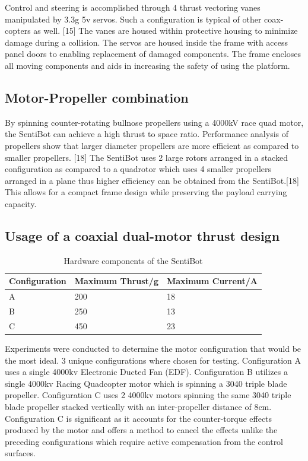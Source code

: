 \documentclass[12pt]{article}
\begin{document}
Control and steering is accomplished through 4 thrust vectoring vanes manipulated by 3.3g 5v servos. Such a configuration is typical of other coax-copters as well. [15] The vanes are housed within protective housing to minimize damage during a collision. The servos are housed inside the frame with access panel doors to enabling replacement of damaged components. The frame encloses all moving components and aids in increasing the safety of using the platform.

\subsection{Motor-Propeller combination}

By spinning counter-rotating bullnose propellers using a 4000kV race quad motor, the SentiBot can achieve a high thrust to space ratio. Performance analysis of propellers show that larger diameter propellers are more efficient as compared to smaller propellers. [18] The SentiBot uses 2 large rotors arranged in a stacked configuration as compared to a quadrotor which uses 4 smaller propellers arranged in a plane thus higher efficiency can be obtained from the SentiBot.[18] This allows for a compact frame design while preserving the payload carrying capacity.

\subsection{Usage of a coaxial dual-motor thrust design}

\begin{table}[b]
	\begin{tabular}{ | l | l l | }
		Configuration & Maximum Thrust/g & Maximum Current/A \\
		\hline
		A & 200 & 18 \\
		B & 250 & 13 \\
		C & 450 & 23 \\
	\end{tabular}
	\caption{Hardware components of the SentiBot}
	\label{fig:sb-configs}
\end{table}

Experiments were conducted to determine the motor configuration that would be the most ideal. 3 unique configurations where chosen for testing. Configuration A uses a single 4000kv Electronic Ducted Fan (EDF).  Configuration B utilizes a single 4000kv Racing Quadcopter motor which is spinning a 3040 triple blade propeller. Configuration C uses 2 4000kv motors spinning the same 3040 triple blade propeller stacked vertically with an inter-propeller distance of 8cm. Configuration C is significant as it accounts for the counter-torque effects produced by the motor and offers a method to cancel the effects unlike the preceding configurations which require active compensation from the control surfaces.
\end{document}
